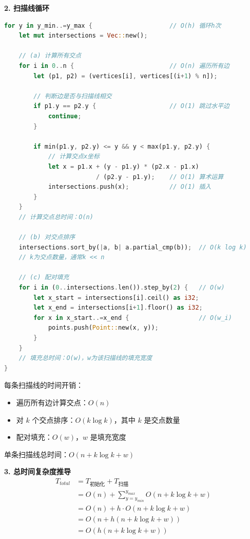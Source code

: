 ﻿\documentclass[12pt,a4paper]{article}
\begin{document}
\textbf{2. 扫描线循环}
\begin{lstlisting}[language=Rust, numbers=none]
for y in y_min..=y_max {                     // O(h) 循环h次
    let mut intersections = Vec::new();
    
    // (a) 计算所有交点
    for i in 0..n {                          // O(n) 遍历所有边
        let (p1, p2) = (vertices[i], vertices[(i+1) % n]);
        
        // 判断边是否与扫描线相交
        if p1.y == p2.y {                    // O(1) 跳过水平边
            continue;
        }
        
        if min(p1.y, p2.y) <= y && y < max(p1.y, p2.y) {
            // 计算交点x坐标
            let x = p1.x + (y - p1.y) * (p2.x - p1.x) 
                         / (p2.y - p1.y);    // O(1) 算术运算
            intersections.push(x);           // O(1) 插入
        }
    }
    // 计算交点总时间：O(n)
    
    // (b) 对交点排序
    intersections.sort_by(|a, b| a.partial_cmp(b));  // O(k log k)
    // k为交点数量，通常k << n
    
    // (c) 配对填充
    for i in (0..intersections.len()).step_by(2) {   // O(w)
        let x_start = intersections[i].ceil() as i32;
        let x_end = intersections[i+1].floor() as i32;
        for x in x_start..=x_end {                   // O(w_i)
            points.push(Point::new(x, y));
        }
    }
    // 填充总时间：O(w)，w为该扫描线的填充宽度
}
\end{lstlisting}

每条扫描线的时间开销：
\begin{itemize}
\item 遍历所有边计算交点：$O(n)$
\item 对 $k$ 个交点排序：$O(k \log k)$，其中 $k$ 是交点数量
\item 配对填充：$O(w)$，$w$ 是填充宽度
\end{itemize}

单条扫描线总时间：$O(n + k \log k + w)$

\textbf{3. 总时间复杂度推导}
\begin{align}
T_{total} &= T_{初始化} + T_{扫描} \\
&= O(n) + \sum_{y=y_{min}}^{y_{max}} O(n + k \log k + w) \\
&= O(n) + h \cdot O(n + k \log k + w) \\
&= O(n + h(n + k \log k + w)) \\
&= O(h(n + k \log k + w))
\end{align}
\end{document}
